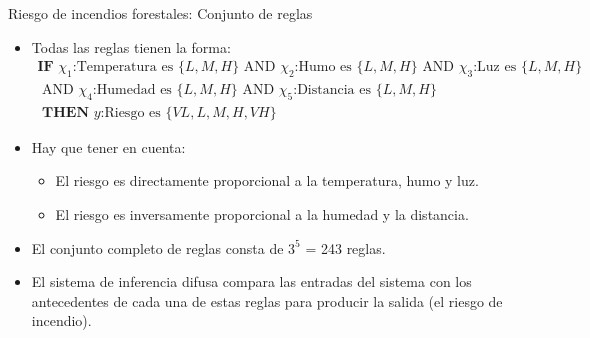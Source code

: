 \documentclass{beamer}
\begin{document}
\begin{frame}{Riesgo de incendios forestales: Conjunto de reglas}
\begin{itemize}
\item Todas las reglas tienen la forma:
	\scriptsize
	\begin{multline}
	\textbf{IF }\chi_1  \text{:Temperatura es }\{L,M,H\} \text{ AND }\chi_2  \text{:Humo es }\{L,M,H\} \text{ AND }\chi_3 \text{:Luz es }\{L,M,H\} \\
	\text{ AND }\chi_4  \text{:Humedad es }\{L,M,H\} \text{ AND }\chi_5 \text{:Distancia es }\{L,M,H\} \\
	\textbf{ THEN }y \text{:Riesgo es }\{VL,L,M,H,VH\}
	\end{multline}
\item \normalsize Hay que tener en cuenta:
	\begin{itemize}
		\item El riesgo es directamente proporcional a la temperatura, humo y luz.
		\item El riesgo es inversamente proporcional a la humedad y la distancia.
	\end{itemize}
\item El conjunto completo de reglas consta de $3^5$ = 243 reglas.
\item El sistema de inferencia difusa compara las entradas del sistema con los antecedentes de cada una de estas reglas para producir la salida (el riesgo de incendio).
\end{itemize}
\end{frame}
\end{document}
